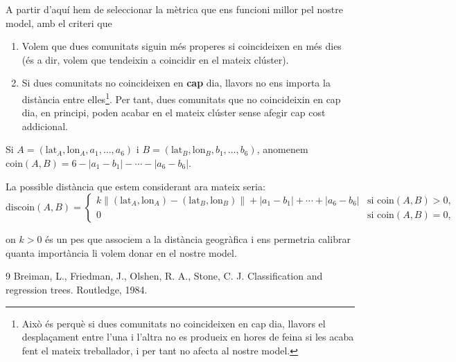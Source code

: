 \documentclass[12pt]{article}
\begin{document}
A partir d'aquí hem de seleccionar la mètrica que ens funcioni millor pel nostre model, amb el criteri que

\begin{enumerate}
	\item Volem que dues comunitats siguin més properes si coincideixen en més dies (és a dir, volem que tendeixin a coincidir en el mateix clúster).
	\item Si dues comunitats no coincideixen en \textbf{cap} dia, llavors no ens importa la distància entre elles\footnote{Això és perquè si dues comunitats no coincideixen en cap dia, llavors el desplaçament entre l'una i l'altra no es produeix en hores de feina si les acaba fent el mateix treballador, i per tant no afecta al nostre model.}.
		Per tant, dues comunitats que no coincideixin en cap dia, en principi, poden acabar en el mateix clúster sense afegir cap cost addicional.
\end{enumerate}

Si $A = (\mathrm{lat}_A, \mathrm{lon}_A, a_1, \dots, a_6)$ i $B = (\mathrm{lat}_B, \mathrm{lon}_B, b_1, \dots, b_6)$, anomenem $\mathrm{coin}(A,B) = 6 - |a_1 - b_1| - \cdots - |a_6 - b_6|$.

La possible distància que estem considerant ara mateix seria:
\[\mathrm{discoin}(A,B) = \begin{cases} k \|(\mathrm{lat}_A, \mathrm{lon}_A) - (\mathrm{lat}_B, \mathrm{lon}_B)\| + |a_1 - b_1| + \cdots + |a_6 - b_6| & \text{si } \mathrm{coin}(A,B) > 0, \\ 0 & \text{si } \mathrm{coin}(A,B) = 0, \end{cases}\]

	on $k > 0$ és un pes que associem a la distància geogràfica i ens permetria calibrar quanta importància li volem donar en el nostre model. 

\begin{thebibliography}{9}
	 Breiman, L., Friedman, J., Olshen, R. A., Stone, C. J. Classification and regression trees. Routledge, 1984.
\end{thebibliography}
\end{document}
